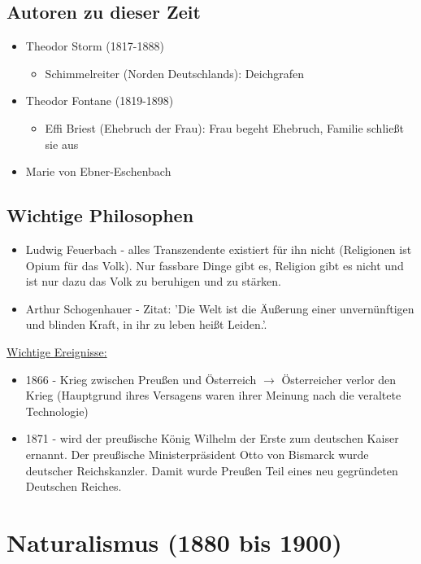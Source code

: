 \documentclass[12pt,a4paper]{article}
\begin{document}
\subsection{Autoren zu dieser Zeit}
\begin{itemize}
\item Theodor Storm (1817-1888)
	\begin{itemize}
	\item Schimmelreiter (Norden Deutschlands): Deichgrafen
	\end{itemize}
\item Theodor Fontane (1819-1898)
	\begin{itemize}
	\item Effi Briest (Ehebruch der Frau): Frau begeht Ehebruch, Familie schließt sie aus
	\end{itemize}
\item Marie von Ebner-Eschenbach
\end{itemize}

\subsection{Wichtige Philosophen}

\begin{itemize}
\item Ludwig Feuerbach - alles Transzendente existiert für ihn nicht (Religionen ist Opium für das Volk). Nur fassbare Dinge gibt es, Religion gibt es nicht und ist nur dazu das Volk zu beruhigen und zu stärken.
\item Arthur Schogenhauer - Zitat: 'Die Welt ist die Äußerung einer unvernünftigen und blinden Kraft, in ihr zu leben heißt Leiden.'. 
\end{itemize}	

\underline{Wichtige Ereignisse:}

\begin{itemize}
\item 1866 - Krieg zwischen Preußen und Österreich $\rightarrow$ Österreicher verlor den Krieg (Hauptgrund ihres Versagens waren ihrer Meinung nach die veraltete Technologie)
\item 1871 - wird der preußische König Wilhelm der Erste zum deutschen Kaiser ernannt. Der preußische Ministerpräsident Otto von Bismarck wurde deutscher Reichskanzler. Damit wurde Preußen Teil eines neu gegründeten Deutschen Reiches.
\end{itemize}

\newpage

\section{Naturalismus (1880 bis 1900)}
\end{document}
